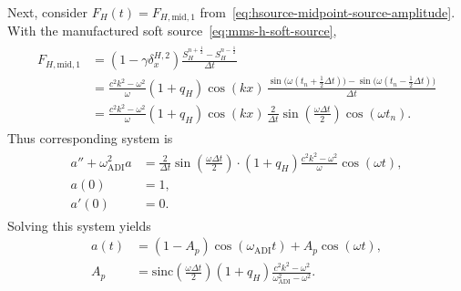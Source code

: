 \documentclass{article}
\numberwithin{figure}{section}
\begin{document}
Next, consider $F_H(t)=F_{H,\mathrm{mid,1}}$ from~\eqref{eq:hsource-midpoint-source-amplitude}.
With the manufactured soft source~\eqref{eq:mms-h-soft-source},
\begin{align}
    \begin{split}
        F_{H,\mathrm{mid,1}}
         & =\left(1-\gamma\delta_x^{H,2}\right)\frac{S_H^{n+\frac{1}{2}}-S_H^{n-\frac{1}{2}}}{\Delta t}                                                   \\
         & =\frac{c^2k^2-\omega^2}{\omega}(1+q_H)\cos(kx)\,
        \frac{\sin\bigl(\omega(t_n+\tfrac12\Delta t)\bigr)-\sin\bigl(\omega(t_n-\tfrac12\Delta t)\bigr)}{\Delta t} \\
         & =\frac{c^2k^2-\omega^2}{\omega}(1+q_H)\cos(kx)\,
        \frac{2}{\Delta t}\sin\left(\frac{\omega\Delta t}{2}\right)\cos(\omega t_n).
    \end{split}
    \label{eq:mms-h-F-mid1-real}
\end{align}
Thus corresponding system is
\begin{align}
    \begin{split}
        a''+\omega_{\mathrm{ADI}}^2 a
         & =\frac{2}{\Delta t}\sin\left(\frac{\omega\Delta t}{2}\right)\cdot(1+q_H)\frac{c^2k^2-\omega^2}{\omega}\cos(\omega t), \\
        a(0)
         & =1,                                                                                                            \\
        a'(0)
         & =0.
    \end{split}
    \label{eq:mms-h-forced-mid1}
\end{align}
Solving this system yields
\begin{equation}
    \begin{aligned}
        a(t)
         & =\left(1-A_p\right)\cos(\omega_{\mathrm{ADI}}t)+A_p\cos(\omega t),                                           \\
        A_p
         & =\mathrm{sinc}\left(\frac{\omega\Delta t}{2}\right)(1+q_H)\frac{c^2k^2-\omega^2}{\omega_{\mathrm{ADI}}^2-\omega^2}.
    \end{aligned}
    \label{eq:mms-h-solution-mid1}
\end{equation}
\end{document}
